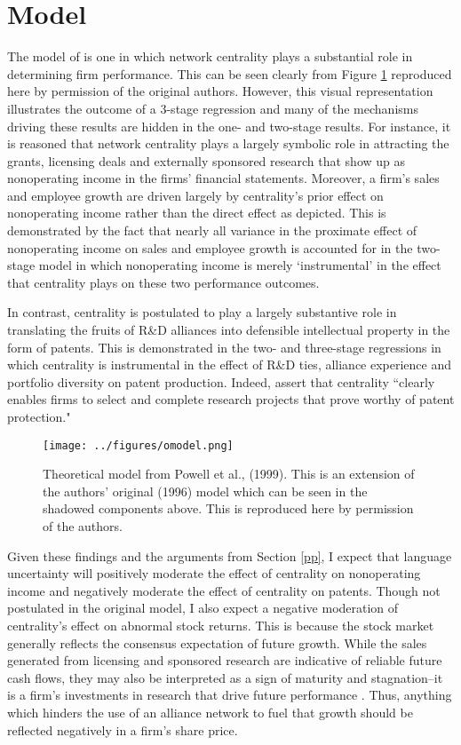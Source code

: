 \section{Model}
The model of \citet{powell1999} is one in which network centrality plays a substantial role in determining firm performance. This can be seen clearly from Figure \ref{omodel} reproduced here by permission of the original authors. However, this visual representation illustrates the outcome of a 3-stage regression and many of the mechanisms driving these results are hidden in the one- and two-stage results.  For instance, it is reasoned that network centrality plays a largely symbolic role in attracting the grants, licensing deals and externally sponsored research that show up as nonoperating income in the firms' financial statements. Moreover, a firm's sales and employee growth are driven largely by centrality's prior effect on nonoperating income rather than the direct effect as depicted. This is demonstrated by the fact that nearly all variance in the proximate effect of nonoperating income on sales and employee growth is accounted for in the two-stage model in which nonoperating income is merely `instrumental' in the effect that centrality plays on these two performance outcomes.

In contrast, centrality is postulated to play a largely substantive role in translating the fruits of R\&D alliances into defensible intellectual property in the form of patents. This is demonstrated in the two- and three-stage regressions in which centrality is instrumental in the effect of R\&D ties, alliance experience and portfolio diversity on patent production. Indeed, \citet[p. 20]{powell1999} assert that centrality ``clearly enables firms to select and complete research projects that prove worthy of patent protection."

\begin{figure}
\begin{center}
\texttt{[image: ../figures/omodel.png]}
\caption[Powell et al., (1999) Model]{Theoretical model from Powell et al., (1999). This is an extension of the authors' original (1996) model which can be seen in the shadowed components above. This is reproduced here by permission of the authors.\label{omodel}}
\end{center}
\end{figure}

Given these findings and the arguments from Section \ref{pp}, I expect that language uncertainty will positively moderate the effect of centrality on nonoperating income and negatively moderate the effect of centrality on patents. Though not postulated in the original model, I also expect a negative moderation of centrality's effect on abnormal stock returns. This is because the stock market generally reflects the consensus expectation of future growth. While the sales generated from licensing and sponsored research are indicative of reliable future cash flows, they may also be interpreted as a sign of maturity and stagnation--it is a firm's investments in research that drive future performance \citep{wolff2001}. Thus, anything which hinders the use of an alliance network to fuel that growth should be reflected negatively in a firm's share price. 

